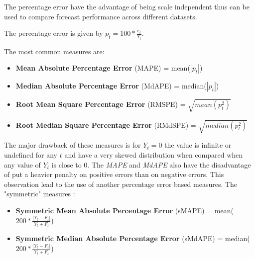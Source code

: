 The percentage error have the advantage of being scale independent thus can be
used to compare forecast performance across different datasets.

The percentage error is given by \begin{math} p_t = 100 * \frac{e_t}{Y_t}
\end{math}.


The most common measures are:
\begin{itemize}
  \item \textbf{Mean Absolute Percentage Error} (MAPE) = mean(\begin{math}
      \left|p_t\right|\end{math})
    \item \textbf{Median Absolute Percentage Error} (MdAPE) = median(\begin{math}
      \left|p_t\right|\end{math})
    \item \textbf{Root Mean Square Percentage Error} (RMSPE) = \begin{math}\sqrt{mean(
      p_t^2)}\end{math}
    \item \textbf{Root Median Square Percentage Error} (RMdSPE) = \begin{math}\sqrt{median(
      p_t^2)}\end{math}
\end{itemize}

The major drawback of these measures is for \begin{math} Y_t = 0 \end{math} the
value is infinite or undefined for any \begin{math} t \end{math} and have a
very skewed distribution when compared when any value of \begin{math} Y_t
\end{math} is close to 0.
The \emph{MAPE} and \emph{MdAPE} also have the disadvantage of put a heavier
penalty on positive errors than on negative errors. This observation lead to the
use of another percentage error based measures. The "symmetric" measures
\cite{RePEc:eee:intfor:v:9:y:1993:i:4:p:527-529}:
\begin{itemize}
  \item \textbf{Symmetric Mean Absolute Percentage Error} (sMAPE) = mean(\begin{math}
      200 * \frac{\left| Y_t - F_t \right|}{Y_t + F_t}\end{math})
    \item \textbf{Symmetric Median Absolute Percentage Error} (sMdAPE) = median(\begin{math}
      200 * \frac{\left| Y_t - F_t \right|}{Y_t + F_t}\end{math})
\end{itemize}

